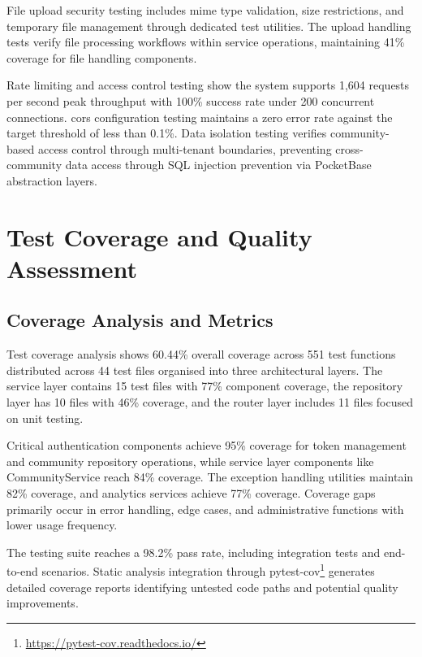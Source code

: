 File upload security testing includes \ac{mime} type validation, size restrictions, and temporary file management through dedicated test utilities. The upload handling tests verify file processing workflows within service operations, maintaining 41\% coverage for file handling components.

Rate limiting and access control testing show the system supports 1,604 requests per second peak throughput with 100\% success rate under 200 concurrent connections. \ac{cors} configuration testing maintains a zero error rate against the target threshold of less than 0.1\%. Data isolation testing verifies community-based access control through multi-tenant boundaries, preventing cross-community data access through SQL injection prevention via PocketBase abstraction layers.


\section{Test Coverage and Quality Assessment} \label{section:test_coverage_quality}

\subsection{Coverage Analysis and Metrics} \label{subsection:coverage_analysis}

Test coverage analysis shows 60.44\% overall coverage across 551 test functions distributed across 44 test files organised into three architectural layers. The service layer contains 15 test files with 77\% component coverage, the repository layer has 10 files with 46\% coverage, and the router layer includes 11 files focused on unit testing.

Critical authentication components achieve 95\% coverage for token management and community repository operations, while service layer components like CommunityService reach 84\% coverage. The exception handling utilities maintain 82\% coverage, and analytics services achieve 77\% coverage. Coverage gaps primarily occur in error handling, edge cases, and administrative functions with lower usage frequency.

The testing suite reaches a 98.2\% pass rate, including integration tests and end-to-end scenarios. Static analysis integration through pytest-cov\footnote{\url{https://pytest-cov.readthedocs.io/}} generates detailed coverage reports identifying untested code paths and potential quality improvements.

